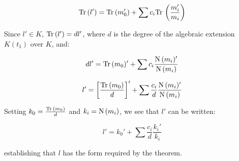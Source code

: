 \begin{enumerate}
$${\rm Tr\,}(l') = {\rm Tr\,}(m_0') + \sum c_i {\rm Tr\,} \left( \frac{m_i'}{m_i} \right)$$

Since $l' \in K$, ${\rm Tr\,}(l') = d l'$, where $d$ is the degree of the
algebraic extension $K(t_1)$ over $K$, and:

$$d l' = {\rm Tr\,}(m_0)' + \sum c_i \frac{{\rm N\,}(m_i)'}{{\rm N\,}(m_i)}$$

$$l' = \left[ \frac{{\rm Tr\,}(m_0)}{d} \right]' + \sum \frac{c_i}{d} \frac{{\rm N\,}(m_i)'}{{\rm N\,}(m_i)}$$

Setting $k_0 = \frac{{\rm Tr\,}(m_0)}{d}$ and $k_i = {\rm N\,}(m_i)$, we see that $l'$
can be written:

$$l' = k_0' + \sum \frac{c_i}{d} \frac{k_i'}{k_i}$$

establishing that $l$ has the form required by the theorem.


\end{enumerate}


\begin{comment}

Let $M = K(t_1,\ldots,t_{n-1})$,
so $L = M(t_n)$ is a simple elementary extension of $L$, and the
theorem holds for $M$.

If $L = M(t_n)$ is either an exponential or an algebraic extension
of $M$, then Theorem \ref{basic exponential properties}(4) or
Theorem \ref{basic algebraic properties}(4) establishes that
for $l \in L$, if $l' \in M$ then $l \in M$.  Since $l' \in K$
implies $l' \in M$, we conclude that $l \in M$ and the
theorem holds by induction.

The other case we must consider is when $L = M(t_n)$ is an
logarithm extension of $M$.  In this case, we again know
that $l' \in K$ implies that $l' \in M$, and Theorem
\ref{basic logarithmic properties}(5) tells us that
$l$ must have the form

$$l = m + c t_n \qquad l' = m' + c \frac{m_1'}{m_1}$$

\end{comment}


\begin{comment}

Since $L$ is formed from $K$ by a finite number of simple extensions,
consider the last extension and call it $\theta$, i.e, $L=M(\theta)$
where $K \subset M \subset L$, and $\theta$ is either algebraic,
logarithmic, or exponential over $M$.

Since $l' \in K$, $l' \in M$.  If
$\theta$ were either exponential or algebraic, then by Theorems
\ref{basic exponential properties} and \ref{basic algebraic properties}
$l$ would have to be in $M$.  On the other hand, if $\theta$ were
logarithmic, then by Theorem \ref{basic logarithmic properties} $l$
must have the form $c\theta + m$, where $m\in M$.  Applying this
argument inductively leads us to conclude that $l$ must have the
form...  (FIX AND FINISH THIS PROOF)

\end{comment}

\endtheorem
